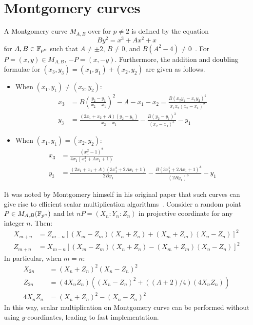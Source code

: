 %
%

\section{Montgomery curves}
\label{sec:montgomery-symmetry}
%
A Montgomery curve $M_{A,B}$ over  for $p\neq 2$ is defined by
the equation \begin{equation}
  By^2=x^3+Ax^2+x \label{eq:montgomery-curve} \end{equation} for
$A,B\in\mathbb F_{p^n}$ such that $A\neq\pm 2$, $B\neq 0$, and
$B(A^2-4)\neq 0$~\cite{1987-montgomery}.
%
For $P=(x,y)\in M_{A,B}$, $-P=(x,-y)$.
%
Furthermore, the addition and doubling formulae for
$(x_3,y_3)=(x_1,y_1)+(x_2,y_2)$ are given as follows.
%
\begin{itemize}
\item When $(x_1,y_1)\neq(x_2,y_2)$:
  \begin{align*}
    x_3 & = B\left(\frac{y_2 - y_1} {x_2 - x_1}\right)^2 - A - x_1 - x_2 = \frac{B(x_2y_1 - x_1y_2)^2} {x_1x_2(x_2 - x_1)^2} \\
    y_3 & = \frac{(2x_1 + x_2 + A)(y_2 - y_1)} {x_2 - x_1} - \frac{B(y_2 - y_1)^3} {(x_2 - x_1)^3} - y_1
  \end{align*}
\item When $(x_1,y_1)=(x_2,y_2)$:
  \begin{align*}
    x_3 & = \frac{(x_1^2 - 1)^2} {4x_1(x_1^2 + Ax_1 + 1)}  \\
    y_3 & = \frac{(2x_1 + x_1 + A)(3x_1^2 + 2Ax_1 + 1)} {2By_1} - \frac{B(3x_1^2 + 2Ax_1 + 1)^3} {(2By_1)^3} - y_1
  \end{align*}
\end{itemize}
%
It was noted by Montgomery himself in his original paper that such
curves can give rise to efficient scalar multiplication
algorithms~\cite{1987-montgomery}.
%
Consider a random point $P\in M_{A,B}(\mathbb F_{p^n})$ and let
$nP=(X_n:Y_n:Z_n)$ in projective coordinate for any integer $n$.
%
Then:
%
\begin{align*}
  X_{m+n} & = Z_{m-n}[(X_m - Z_m)(X_n + Z_n) + (X_m + Z_m)(X_n - Z_n)]^2 \\
  Z_{m+n} & = X_{m-n}[(X_m - Z_m)(X_n + Z_n) - (X_m + Z_m)(X_n - Z_n)]^2
\end{align*}
%
In particular, when $m=n$:
\begin{align*}
  X_{2n} & = (X_n + Z_n)^2(X_n - Z_n)^2 \\
  Z_{2n} & = (4X_nZ_n)\left((X_n - Z_n)^2 + ((A+2)/4)(4X_nZ_n)\right) \\
  4X_nZ_n & = ( X_n + Z_n)^2 - (X_n - Z_n)^2
\end{align*}
%
In this way, scalar multiplication on Montgomery curve can be
performed without using $y$-coordinates, leading to fast
implementation.

